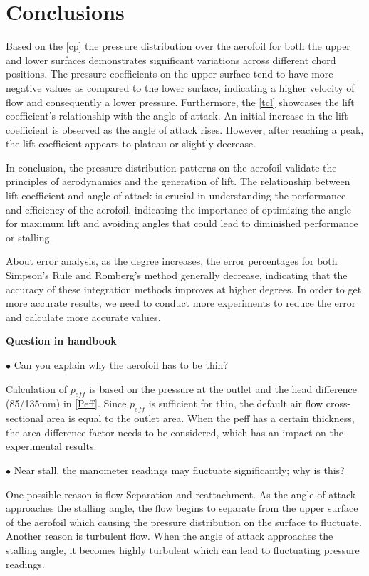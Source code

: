 
\section{Conclusions}
\FloatBarrier %

Based on the \autoref{cp} the pressure distribution over the aerofoil for both the upper and lower surfaces demonstrates significant variations across different chord positions. The pressure coefficients on the upper surface tend to have more negative values as compared to the lower surface, indicating a higher velocity of flow and consequently a lower pressure. Furthermore, the \autoref{tcl} showcases the lift coefficient's relationship with the angle of attack. An initial increase in the lift coefficient is observed as the angle of attack rises. However, after reaching a peak, the lift coefficient appears to plateau or slightly decrease.

In conclusion, the pressure distribution patterns on the aerofoil validate the principles of aerodynamics and the generation of lift. The relationship between lift coefficient and angle of attack is crucial in understanding the performance and efficiency of the aerofoil, indicating the importance of optimizing the angle for maximum lift and avoiding angles that could lead to diminished performance or stalling.

About error analysis, as the degree increases, the error percentages for both Simpson's Rule and Romberg's method generally decrease, indicating that the accuracy of these integration methods improves at higher degrees. In order to get more accurate results, we need to conduct more experiments to reduce the error and calculate more accurate values.

\textbf{Question in handbook}

$\bullet$ Can you explain why the aerofoil has to be thin?

Calculation of $p_{eff}$ is based on the pressure at the outlet and the head difference (85/135mm) in \autoref{Peff}. Since $p_{eff}$ is sufficient for thin, the default air flow cross-sectional area is equal to the outlet area. When the peff has a certain thickness, the area difference factor needs to be considered, which has an impact on the experimental results.

$\bullet$ Near stall, the manometer readings may fluctuate significantly; why is this?

One possible reason is flow Separation and reattachment. As the angle of attack approaches the stalling angle, the flow begins to separate from the upper surface of the aerofoil which causing the pressure distribution on the surface to fluctuate. Another reason is turbulent flow. When the angle of attack approaches the stalling angle, it becomes highly turbulent which can lead to fluctuating pressure readings.

